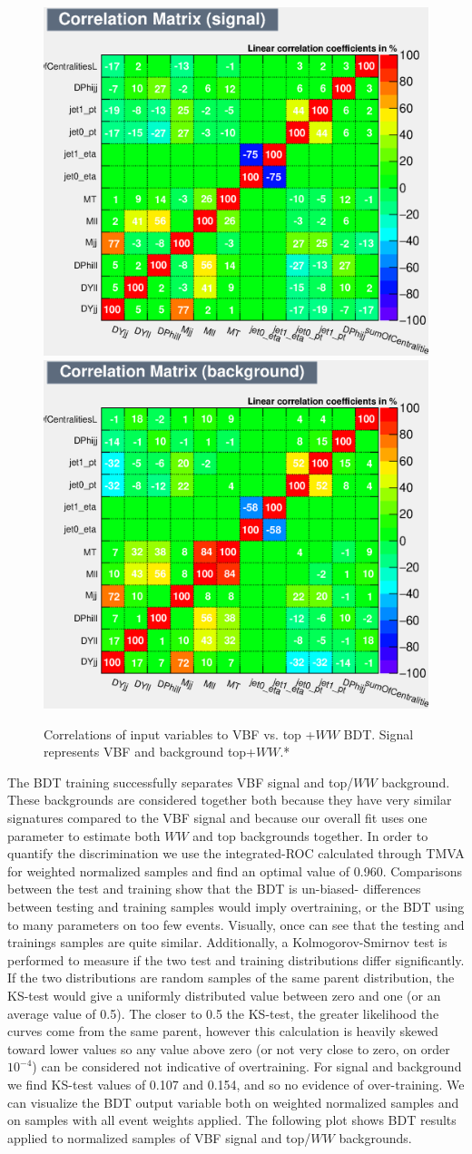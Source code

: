 \begin{figure}[!htbp]
  \centering
  \includegraphics[width=.4\linewidth]{Pictures/VBFvsWW+Top/CorrelationMatrixS.eps}
  \includegraphics[width=.4\linewidth]{Pictures/VBFvsWW+Top/CorrelationMatrixB.eps}
\caption{Correlations of input variables to VBF vs. top +$WW$ BDT. Signal represents VBF and background top+$WW$.*}
\label{fig:SRcorrSB}
\end{figure}
The BDT training successfully separates VBF signal and top/$WW$ background. These backgrounds are considered together both because they have very similar signatures compared to the VBF signal and because our overall fit uses one parameter to estimate both $WW$ and top backgrounds together. In order to quantify the discrimination we use the integrated-ROC calculated through TMVA for weighted normalized samples and find an optimal value of 0.960. Comparisons between the test and training show that the BDT is un-biased- differences between testing and training samples would imply overtraining, or the BDT using to many parameters on too few events. Visually, once can see that the testing and trainings samples are quite similar. Additionally, a Kolmogorov-Smirnov test is performed to measure if the two test and training distributions differ significantly. If the two distributions are random samples of the same parent distribution, the KS-test would give a uniformly distributed value between zero and one (or an average value of 0.5). The closer to 0.5 the KS-test, the greater likelihood the curves come from the same parent, however this calculation is heavily skewed toward lower values so any value above zero (or not very close to zero, on order $10^{-4}$) can be considered not indicative of overtraining. For signal and background we find KS-test values of 0.107 and 0.154, and so no evidence of over-training. We can visualize the BDT output variable both on weighted normalized samples and on samples with all event weights applied. The following plot shows BDT results applied to normalized samples of VBF signal and top/$WW$ backgrounds.

